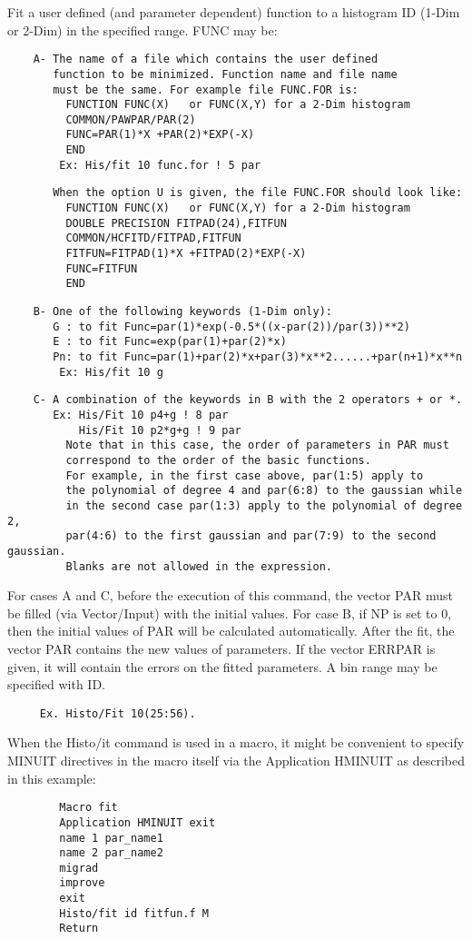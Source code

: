    \par
Fit a user defined (and parameter dependent) function to a histogram ID 
   (1-Dim or 2-Dim) in the specified range.  FUNC may be:  
\begin{verbatim}
    A- The name of a file which contains the user defined
       function to be minimized. Function name and file name
       must be the same. For example file FUNC.FOR is:
         FUNCTION FUNC(X)   or FUNC(X,Y) for a 2-Dim histogram
         COMMON/PAWPAR/PAR(2)
         FUNC=PAR(1)*X +PAR(2)*EXP(-X)
         END
        Ex: His/fit 10 func.for ! 5 par
\end{verbatim}
\begin{verbatim}
       When the option U is given, the file FUNC.FOR should look like:
         FUNCTION FUNC(X)   or FUNC(X,Y) for a 2-Dim histogram
         DOUBLE PRECISION FITPAD(24),FITFUN
         COMMON/HCFITD/FITPAD,FITFUN
         FITFUN=FITPAD(1)*X +FITPAD(2)*EXP(-X)
         FUNC=FITFUN
         END
\end{verbatim}
\begin{verbatim}
    B- One of the following keywords (1-Dim only):
       G : to fit Func=par(1)*exp(-0.5*((x-par(2))/par(3))**2)
       E : to fit Func=exp(par(1)+par(2)*x)
       Pn: to fit Func=par(1)+par(2)*x+par(3)*x**2......+par(n+1)*x**n
        Ex: His/fit 10 g
\end{verbatim}
\begin{verbatim}
    C- A combination of the keywords in B with the 2 operators + or *.
       Ex: His/Fit 10 p4+g ! 8 par
           His/Fit 10 p2*g+g ! 9 par
         Note that in this case, the order of parameters in PAR must
         correspond to the order of the basic functions.
         For example, in the first case above, par(1:5) apply to
         the polynomial of degree 4 and par(6:8) to the gaussian while
         in the second case par(1:3) apply to the polynomial of degree 2,
         par(4:6) to the first gaussian and par(7:9) to the second gaussian.
         Blanks are not allowed in the expression.
\end{verbatim}
   \par
For cases A and C, before the execution of this command, the vector PAR 
   must be filled (via Vector/Input) with the initial values.  For case B, if 
   NP is set to 0, then the initial values of PAR will be calculated 
   automatically.  After the fit, the vector PAR contains the new values of 
   parameters. If the vector ERRPAR is given, it will contain the errors on 
   the fitted parameters.  A bin range may be specified with ID.  
\begin{verbatim}
     Ex. Histo/Fit 10(25:56).
\end{verbatim}
\ENDVERB
   \par
When the Histo/it command is used in a macro, it might be convenient to 
   specify MINUIT directives in the macro itself via the Application HMINUIT 
   as described in this example:  
\begin{verbatim}
        Macro fit
        Application HMINUIT exit
        name 1 par_name1
        name 2 par_name2
        migrad
        improve
        exit
        Histo/fit id fitfun.f M
        Return
\end{verbatim}

